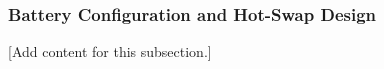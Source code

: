 
\subsubsection{Battery Configuration and Hot-Swap Design}
\label{subsubsec:design_4_1_battery_hotswap_design}

[Add content for this subsection.]
